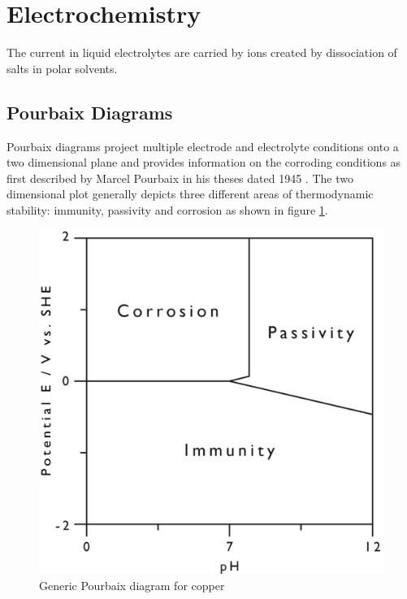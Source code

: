 {%



\newpage
\section{Electrochemistry}{
The current in liquid electrolytes are carried by ions created by dissociation of salts in polar solvents. 

\subsection{Pourbaix Diagrams}

Pourbaix diagrams project multiple electrode and electrolyte conditions onto a two dimensional plane and provides information on the corroding conditions as first described by Marcel Pourbaix in his theses dated 1945 \citep{Pourbaix1945}. The two dimensional plot generally depicts three different areas of thermodynamic stability: immunity, passivity and corrosion  as shown in figure \ref{fig:pourbaix_generic}.

	\begin{figure}
		\centering
		\includegraphics[scale=1]{Figures/pourbaix_generic}
		\caption{Generic Pourbaix diagram for copper}
		\label{fig:pourbaix_generic}
	\end{figure}

}}
